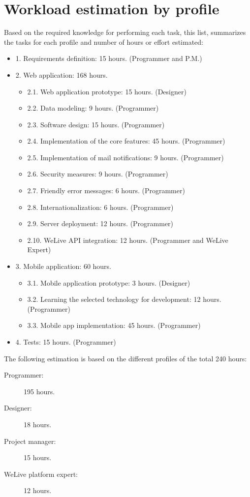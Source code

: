 \documentclass{DeustoFDP}
\begin{document}
\section{Workload estimation by profile}
Based on the required knowledge for performing each task, this list, summarizes the tasks for each profile and number of hours or effort estimated:
\begin{itemize}
	\item 1. Requirements definition: 15 hours. (Programmer and P.M.)
	\item 2. Web application: 168 hours.
	\begin{itemize}
		\item 2.1. Web application prototype: 15 hours. (Designer)
		\item 2.2. Data modeling: 9 hours. (Programmer)
		\item 2.3. Software design: 15 hours. (Programmer)
		\item 2.4. Implementation of the core features: 45 hours. (Programmer)
		\item 2.5. Implementation of mail notifications: 9 hours. (Programmer)
		\item 2.6. Security measures: 9 hours. (Programmer)
		\item 2.7. Friendly error messages: 6 hours. (Programmer)
		\item 2.8. Internationalization: 6 hours. (Programmer)
		\item 2.9. Server deployment: 12 hours. (Programmer)
		\item 2.10. WeLive API integration: 12 hours. (Programmer and WeLive Expert)
	\end{itemize}
	\item 3. Mobile application: 60 hours.
	\begin{itemize}
		\item 3.1. Mobile application prototype: 3 hours. (Designer)
		\item 3.2. Learning the selected technology for development: 12 hours. (Programmer)
		\item 3.3. Mobile app implementation: 45 hours. (Programmer)
	\end{itemize}
	\item 4. Tests: 15 hours. (Programmer)
\end{itemize}

The following estimation is based on the different profiles of the total 240 hours:
\begin{description}
	\item[Programmer:] 195 hours.
	\item[Designer:] 18 hours.
	\item[Project manager:] 15 hours.
	\item[WeLive platform expert:] 12 hours.
\end{description}
\end{document}
